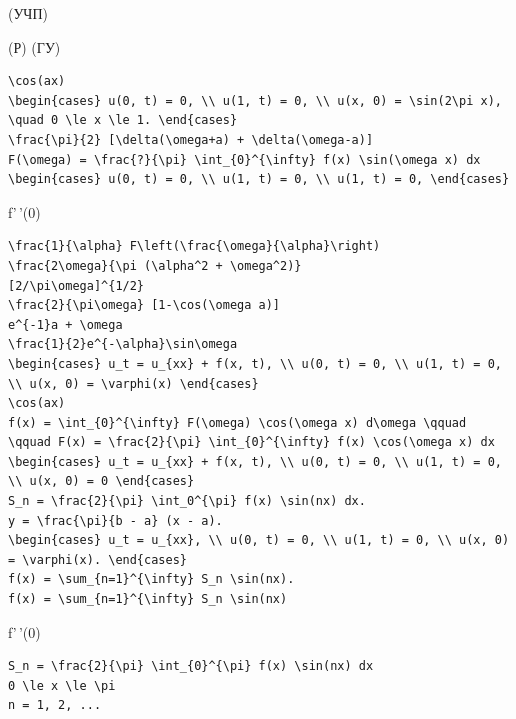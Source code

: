 \documentclass[
  ukrainian,
]{article}
\begin{document}
(УЧП)

(Р) (ГУ)

\begin{verbatim}
\cos(ax)
\begin{cases} u(0, t) = 0, \\ u(1, t) = 0, \\ u(x, 0) = \sin(2\pi x), \quad 0 \le x \le 1. \end{cases}
\frac{\pi}{2} [\delta(\omega+a) + \delta(\omega-a)]
F(\omega) = \frac{?}{\pi} \int_{0}^{\infty} f(x) \sin(\omega x) dx
\begin{cases} u(0, t) = 0, \\ u(1, t) = 0, \\ u(1, t) = 0, \end{cases}
\end{verbatim}

f'\,'(0)

\begin{verbatim}
\frac{1}{\alpha} F\left(\frac{\omega}{\alpha}\right)
\frac{2\omega}{\pi (\alpha^2 + \omega^2)}
[2/\pi\omega]^{1/2}
\frac{2}{\pi\omega} [1-\cos(\omega a)]
e^{-1}a + \omega
\frac{1}{2}e^{-\alpha}\sin\omega
\begin{cases} u_t = u_{xx} + f(x, t), \\ u(0, t) = 0, \\ u(1, t) = 0, \\ u(x, 0) = \varphi(x) \end{cases}
\cos(ax)
f(x) = \int_{0}^{\infty} F(\omega) \cos(\omega x) d\omega \qquad \qquad F(x) = \frac{2}{\pi} \int_{0}^{\infty} f(x) \cos(\omega x) dx
\begin{cases} u_t = u_{xx} + f(x, t), \\ u(0, t) = 0, \\ u(1, t) = 0, \\ u(x, 0) = 0 \end{cases}
S_n = \frac{2}{\pi} \int_0^{\pi} f(x) \sin(nx) dx.
y = \frac{\pi}{b - a} (x - a).
\begin{cases} u_t = u_{xx}, \\ u(0, t) = 0, \\ u(1, t) = 0, \\ u(x, 0) = \varphi(x). \end{cases}
f(x) = \sum_{n=1}^{\infty} S_n \sin(nx).
f(x) = \sum_{n=1}^{\infty} S_n \sin(nx)
\end{verbatim}

f'\,'(0)

\begin{verbatim}
S_n = \frac{2}{\pi} \int_{0}^{\pi} f(x) \sin(nx) dx
0 \le x \le \pi
n = 1, 2, ...
\end{verbatim}
\end{document}
